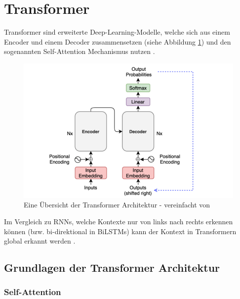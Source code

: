 \section{Transformer}
\label{sec:transformer}

Transformer sind erweiterte Deep-Learning-Modelle, welche sich aus einem Encoder und einem Decoder zusammensetzen (siehe Abbildung 
\ref{fig:transformeroverview}) und den sogenannten Self-Attention Mechanismus nutzen \cite{vaswani2023attentionneed}.

\begin{figure}[htbp]
    \begin{center}
        \includegraphics[scale=0.4]{static/transformer-overview.png}
        \caption{\label{fig:transformeroverview} Eine Übersicht der Transformer Architektur \cite{kikaben2021transformer} 
        - vereinfacht von \cite{vaswani2023attentionneed}}
    \end{center}
\end{figure}

Im Vergleich zu RNNs, welche Kontexte nur von links nach rechts erkennen können (bzw. bi-direktional in BiLSTMs) kann der Kontext in Transformern
global erkannt werden \cite{ghojogh2020}.

\subsection{Grundlagen der Transformer Architektur}

\subsubsection{Self-Attention} \label{sec:self_attention}

